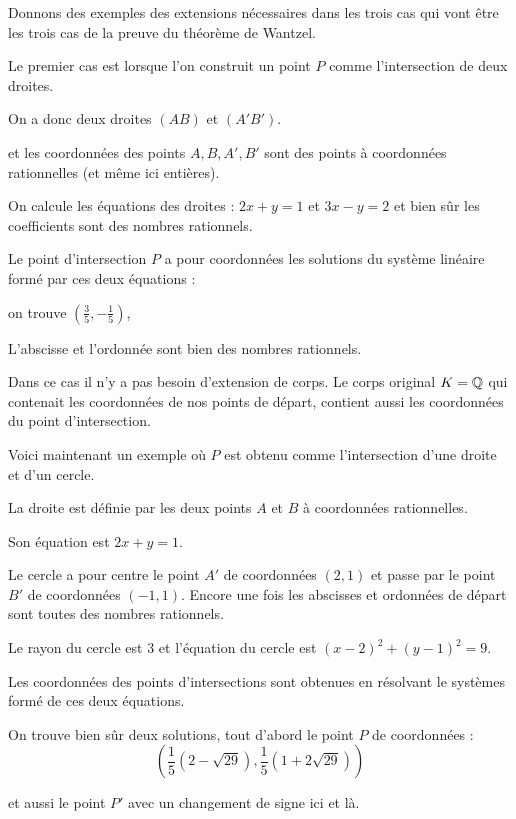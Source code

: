 Donnons des exemples des extensions nécessaires dans les trois cas qui vont 
être les trois cas de la preuve du théorème de Wantzel.


\change
Le premier cas est lorsque l'on construit un point $P$ 
comme l'intersection de deux droites.

\change
On a donc deux droites $(AB)$ et $(A'B')$.

\change
et les coordonnées des points $A, B, A', B'$ sont des points à 
coordonnées rationnelles (et même ici entières).


\change
On calcule les équations des droites :
  $2x+y=1$ et $3x-y=2$ et bien sûr les coefficients sont des nombres rationnels.
  
\change  
Le point d'intersection $P$ a pour coordonnées les solutions du système linéaire
formé par ces deux équations : 

\change
on trouve $(\frac 35, -\frac 15)$,

\change
L'abscisse et l'ordonnée sont bien des nombres rationnels. 

\change
Dans ce cas il n'y a pas besoin d'extension de corps. Le corps original
$K = \mathbb{Q}$ qui contenait les coordonnées de nos points de départ, contient aussi les coordonnées
du point d'intersection.


\diapo

Voici maintenant un exemple où $P$ est obtenu comme l'intersection d'une droite
et d'un cercle.

\change
La droite est définie par les deux points $A$ et $B$ à coordonnées rationnelles.

\change
Son équation est $2x+y=1$.

\change
Le cercle a pour centre le point $A'$ de coordonnées $(2,1)$
et passe par le point $B'$ de coordonnées $(-1,1)$. Encore une fois les abscisses et ordonnées 
de départ sont toutes des nombres rationnels.

\change
Le rayon du cercle est $3$ et l'équation du cercle est 
$(x-2)^2+(y-1)^2=9$.

\change

Les coordonnées des points d'intersections sont obtenues en résolvant le systèmes formé de ces deux équations.

On trouve bien sûr deux solutions, tout d'abord le point $P$ de coordonnées :
  $$\left(\frac 1 5 \left(2- \sqrt{29}\right),\frac 1 5 \left(1+2\sqrt{29}\right) \right)$$

\change
et aussi le point $P'$ avec un changement de signe ici et là.
  
